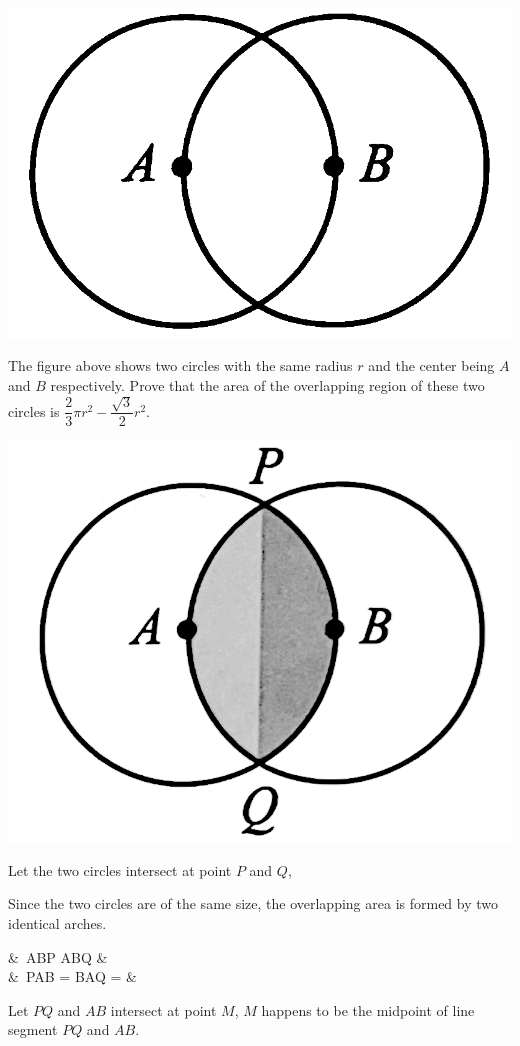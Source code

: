\documentclass{report}
\begin{document}
\begin{question}
	\begin{center}
		\includegraphics[scale=0.12]{assets/8-11.png}
	\end{center}
	\noindent The figure above shows two circles with the same radius $r$ and the center being $A$ and $B$ respectively. Prove that the area of the overlapping region of these two circles is $\dfrac{2}{3} \pi r^2 - \dfrac{\sqrt{3}}{2}r^2$.
	
	\sol{}
	
	\includegraphics[scale=0.12]{assets/8-12.png}
	    
	\noindent Let the two circles intersect at point $P$ and $Q$,
	    
	\noindent Since the two circles are of the same size, the overlapping area is formed by two identical arches.
	\begin{flalign*}
		\because &\ \triangle ABP  \triangle ABQ &\\
		\therefore &\ \angle PAB = \angle BAQ =  &
	\end{flalign*}
	\vspace*{-2em}
	\begin{vwcol}[widths={0.7,0.3},rule=0pt,sep=3em]
		Let $PQ$ and $AB$ intersect at point $M$, $M$ happens to be the midpoint of line segment $PQ$ and $AB$.
		

\end{vwcol}
\end{question}
\end{document}
